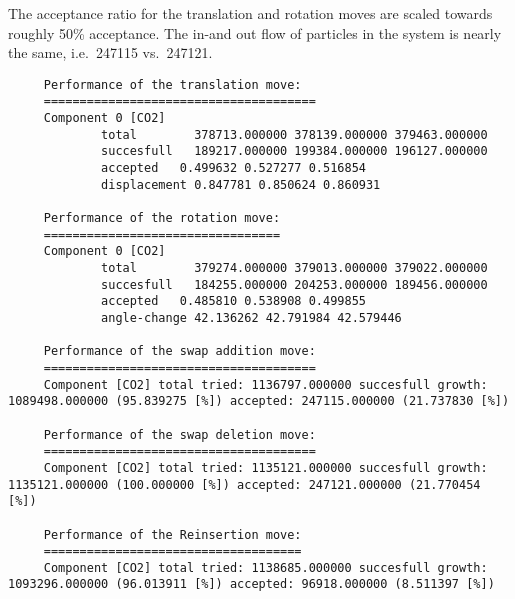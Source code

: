 \noindent
The acceptance ratio for the translation and rotation moves are scaled towards roughly 50\% acceptance.
The in-and out flow of particles in the system is nearly the same, i.e.\ 247115 vs.\ 247121.
\begin{tiny}
\begin{verbatim}
     Performance of the translation move:
     ======================================
     Component 0 [CO2]
             total        378713.000000 378139.000000 379463.000000
             succesfull   189217.000000 199384.000000 196127.000000
             accepted   0.499632 0.527277 0.516854
             displacement 0.847781 0.850624 0.860931

     Performance of the rotation move:
     =================================
     Component 0 [CO2]
             total        379274.000000 379013.000000 379022.000000
             succesfull   184255.000000 204253.000000 189456.000000
             accepted   0.485810 0.538908 0.499855
             angle-change 42.136262 42.791984 42.579446

     Performance of the swap addition move:
     ======================================
     Component [CO2] total tried: 1136797.000000 succesfull growth: 1089498.000000 (95.839275 [%]) accepted: 247115.000000 (21.737830 [%])

     Performance of the swap deletion move:
     ======================================
     Component [CO2] total tried: 1135121.000000 succesfull growth: 1135121.000000 (100.000000 [%]) accepted: 247121.000000 (21.770454 [%])

     Performance of the Reinsertion move:
     ====================================
     Component [CO2] total tried: 1138685.000000 succesfull growth: 1093296.000000 (96.013911 [%]) accepted: 96918.000000 (8.511397 [%])
\end{verbatim}
\end{tiny}

